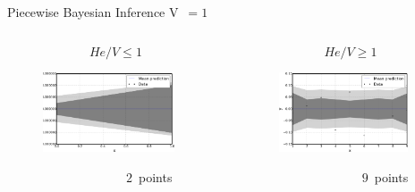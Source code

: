 \documentclass[10pt]{beamer}
\begin{document}
\begin{frame}{Piecewise Bayesian Inference V~$= 1$}
  	\begin{columns}[onlytextwith]
    	\begin{column}{0.5\textwidth}
    	$$He/V \leq 1$$
      		\begin{figure}
        		\includegraphics[width=0.9\textwidth]{low1ResultDiff}
      		\end{figure}
      		~~~~~~~~~~~~~~~~~~~$2$~points
    	\end{column}  
    	\begin{column}{0.5\textwidth}
    	$$He/V \geq 1$$
      		\begin{figure}
        		\includegraphics[width=0.9\textwidth]{high1ResultDiff}
      		\end{figure}
      		~~~~~~~~~~~~~~~~~~~$9$~points
    	\end{column}
  	\end{columns}
\end{frame}
\end{document}
